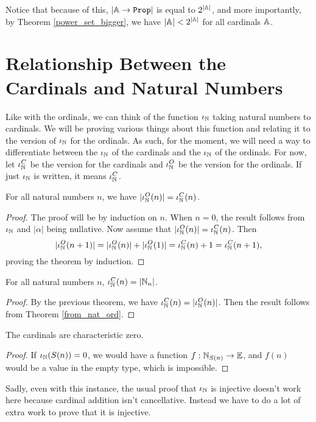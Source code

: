 \documentclass[../../math.tex]{subfiles}
\begin{document}
Notice that because of this, $|\A \to \Prop|$ is equal to $2^{|\mathbb{A}|}$, and more
importantly, by Theorem \ref{power_set_bigger}, we have $|\mathbb{A}| < 2^{|\mathbb{A}|}$ for
all cardinals $\mathbb{A}$.

\section{Relationship Between the Cardinals and Natural Numbers}

Like with the ordinals, we can think of the function $\iota_{\mathbb{N}}$ taking natural
numbers to cardinals.  We will be proving various things about this function and
relating it to the version of $\iota_{\mathbb{N}}$ for the ordinals.  As such, for the moment,
we will need a way to differentiate between the $\iota_{\mathbb{N}}$ of the cardinals and the
$\iota_{\mathbb{N}}$ of the ordinals.  For now, let $\iota_{\mathbb{N}}^C$ be the version for the cardinals
and $\iota_{\mathbb{N}}^O$ be the version for the ordinals.  If just $\iota_{\mathbb{N}}$ is written, it means
$\iota_{\mathbb{N}}^C$.

\begin{theorem} \label{ord_to_card_nat}
    For all natural numbers $n$, we have $|\iota_{\mathbb{N}}^O(n)| = \iota_{\mathbb{N}}^C(n)$.
\end{theorem}
\begin{proof}
    The proof will be by induction on $n$.  When $n = 0$, the result follows
    from $\iota_{\mathbb{N}}$ and $|\alpha|$ being nullative.  Now assume that $|\iota_{\mathbb{N}}^O(n)| =
    \iota_{\mathbb{N}}^C(n)$.  Then
    \[
        |\iota_{\mathbb{N}}^O(n + 1)| = |\iota_{\mathbb{N}}^O(n)| + |\iota_{\mathbb{N}}^O(1)| = \iota_{\mathbb{N}}^C(n) + 1 = \iota_{\mathbb{N}}^C(n + 1),
    \]
    proving the theorem by induction.
\end{proof}

\begin{theorem} \label{from_nat_card}
    For all natural numbers $n$, $\iota_{\mathbb{N}}^C(n) = |\mathbb{N}_n|$.
\end{theorem}
\begin{proof}
    By the previous theorem, we have $\iota_{\mathbb{N}}^C(n) = |\iota_{\mathbb{N}}^O(n)|$.  Then the result
    follows from Theorem \ref{from_nat_ord}.
\end{proof}

\begin{instance}
    The cardinals are characteristic zero.
\end{instance}
\begin{proof}
    If $\iota_{\mathbb{N}}(S(n)) = 0$, we would have a function $f : \mathbb{N}_{S(n)} \to \mathbb{E}$, and
    $f(n)$ would be a value in the empty type, which is impossible.
\end{proof}

Sadly, even with this instance, the usual proof that $\iota_{\mathbb{N}}$ is injective doesn't
work here because cardinal addition isn't cancellative.  Instead we have to do a
lot of extra work to prove that it is injective.
\end{document}

